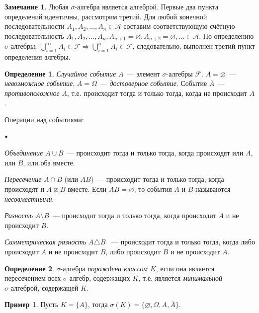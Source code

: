\documentclass[oneside,final,14pt]{extreport}
\theoremstyle{plain}
\theoremstyle{definition}
\newtheorem*{defn}{Определение}
\newtheorem*{exmp}{Пример}
\newtheorem*{rmrk}{Замечание}
\theoremstyle{named}
\newcommand\sbullet[1][.5]{\mathbin{\vcenter{\hbox{\scalebox{#1}{$\bullet$}}}}}
\newenvironment{compactlist}{
\begin{list}{{$\sbullet[.75]$}}{
\setlength\partopsep{0pt}
\setlength\parskip{0pt}
\setlength\parsep{0pt}
\setlength\topsep{0pt}
\setlength\itemsep{0pt}
}
}{
\end{list}
}
\begin{document}
\begin{rmrk}
    Любая $\sigma \text{-алгебра}$ является алгеброй. Первые два пункта определений идентичны, рассмотрим третий. Для любой конечной последовательности $A_1, A_2,\ldots, A_n \in \mathcal{A}$ составим соответствующую счётную последовательность $A_1, A_2, \ldots, A_n, A_{n+1}=\varnothing, A_{n+2}=\varnothing,\ldots \in \mathcal{A}$. По определению $\sigma \text{-алгебры}$: $\bigcup\limits_{i=1}^\infty A_i \in \mathcal{F} \Rightarrow \bigcup\limits_{i=1}^n A_i \in \mathcal{F}$, следовательно, выполнен третий пункт определения алгебры.
\end{rmrk}

\begin{defn}
    {\it Случайное событие} $A$~--- элемент $\sigma \text{-алгебры~} \mathcal{F}$. $A=\varnothing$~---{\it невозможное событие}, $A=\Omega$~--- {\it достоверное событие}. Событие $\overline{A}$~--- {\it противоположное} $A$, т.е. происходит тогда и только тогда, когда не происходит $A$.

Операции над событиями:

\begin{compactlist}
    \item {\it Объединение} $A \cup B$~--- происходит тогда и только тогда, когда происходят или $A$, или $B$, или оба вместе.
    \item {\it Пересечение} $A \cap B$ (или $AB$)~--- происходит тогда и только тогда, когда происходят и $A$ и $B$ вместе. Если $AB = \varnothing$, то события $A$ и $B$ называются {\it несовместными}.
    \item {\it Разность} $A \setminus B$~--- происходит тогда и только тогда, когда происходит $A$ и не происходит $B$.
    \item {\it Симметрическая разность} $A \triangle B$ ~--- происходит тогда и только тогда, когда либо происходит $A$ и не происходит $B$, либо происходит $B$ и не происходит $A$.
\end{compactlist}
\end{defn}

\begin{defn}
    $\sigma \text{-алгебра}$ {\it порождена классом $K$}, если она является пересечением всех $\sigma \text{-алгебр}$, содержащих $K$, т.е. является {\it минимальной $\sigma \text{-алгеброй}$}, содержащей $K$.
\end{defn}

\begin{exmp}
    Пусть $K = \{A\}$, тогда $\sigma (K) = \{\varnothing, \Omega, A, \overline{A}\}$.
\end{exmp}
\end{document}

